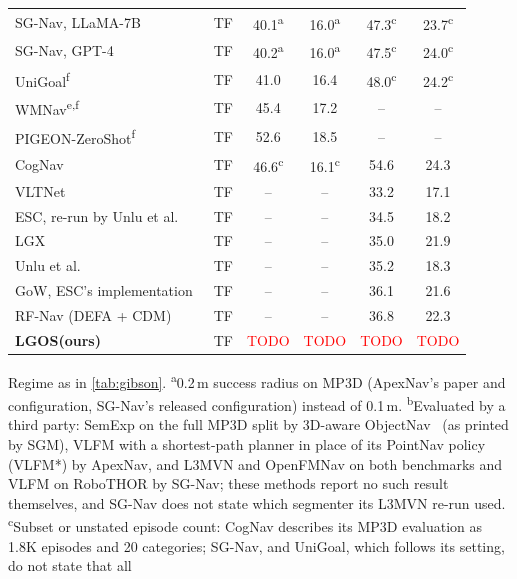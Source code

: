 \documentclass[10pt]{article}
\newcommand{\tbd}{\textcolor{red}{TODO}}
\newcommand{\ours}{LGOS\xspace}
\begin{document}
\begin{table}[tp]
\begin{tabular}{@{}llcccc@{}}
SG-Nav, LLaMA-7B~\citep{yin2024sg} & TF & 40.1\textsuperscript{a} & 16.0\textsuperscript{a} & 47.3\textsuperscript{c} & 23.7\textsuperscript{c} \\
SG-Nav, GPT-4~\citep{yin2024sg} & TF & 40.2\textsuperscript{a} & 16.0\textsuperscript{a} & 47.5\textsuperscript{c} & 24.0\textsuperscript{c} \\
UniGoal\textsuperscript{f}~\citep{yin2025unigoal} & TF & 41.0 & 16.4 & 48.0\textsuperscript{c} & 24.2\textsuperscript{c} \\
WMNav\textsuperscript{e,f}~\citep{nie2025wmnav} & TF & 45.4 & 17.2 & -- & -- \\
PIGEON-ZeroShot\textsuperscript{f}~\citep{peng2025pigeon} & TF & 52.6 & 18.5 & -- & -- \\
CogNav~\citep{cao2025cognav} & TF & 46.6\textsuperscript{c} & 16.1\textsuperscript{c} & 54.6 & 24.3 \\
VLTNet~\citep{vltnet2024} & TF & -- & -- & 33.2 & 17.1 \\
ESC, re-run by Unlu et al.~\citep{unlu2024reproducibility} & TF & -- & -- & 34.5 & 18.2 \\
LGX~\citep{dorbala2024can} & TF & -- & -- & 35.0 & 21.9 \\
Unlu et al.~\citep{unlu2024reproducibility} & TF & -- & -- & 35.2 & 18.3 \\
GoW, ESC's implementation~\citep{zhou2023esc} & TF & -- & -- & 36.1 & 21.6 \\
RF-Nav (DEFA + CDM)~\citep{yuan2024defa} & TF & -- & -- & 36.8 & 22.3 \\
\midrule
\textbf{\ours (ours)} & TF & \tbd & \tbd & \tbd & \tbd \\
\bottomrule
\end{tabular}
\par\smallskip
\parbox{\linewidth}{\footnotesize Regime as in \cref{tab:gibson}. \textsuperscript{a}0.2\,m success radius on MP3D
(ApexNav's paper and configuration, SG-Nav's released configuration) instead of 0.1\,m. \textsuperscript{b}Evaluated
by a third party: SemExp on the full MP3D split by 3D-aware ObjectNav~\citep{zhang20233d} (as printed by SGM),
VLFM with a shortest-path planner in place of its PointNav policy (VLFM*) by ApexNav, and L3MVN and OpenFMNav on both
benchmarks and VLFM on RoboTHOR by SG-Nav; these methods report no such result themselves, and SG-Nav does not state
which segmenter its L3MVN re-run used. \textsuperscript{c}Subset or unstated episode count: CogNav describes its MP3D
evaluation as 1.8K episodes and 20 categories; SG-Nav, and UniGoal, which follows its setting, do not state that all
}
\end{table}
\end{document}
